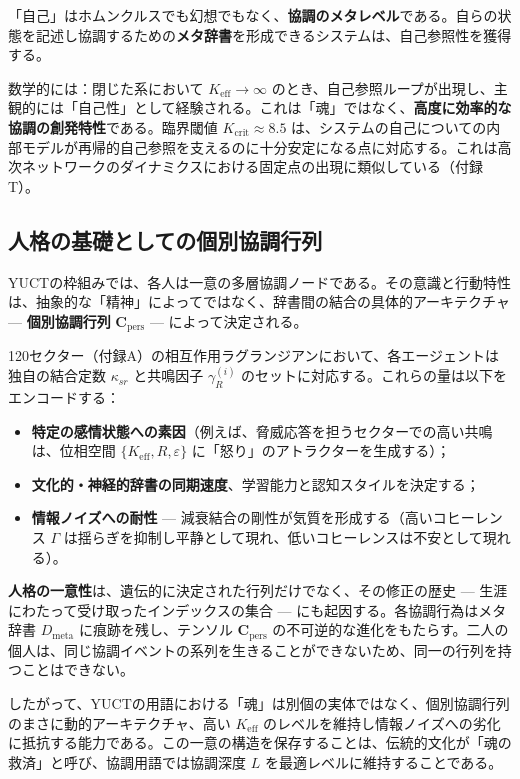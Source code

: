 \documentclass[12pt,a4paper]{article}
\newcommand{\eff}{\mathrm{eff}}
\newcommand{\Ke}{K_{\eff}}
\newcommand{\Kcrit}{K_{\mathrm{crit}}}
\begin{document}
	「自己」はホムンクルスでも幻想でもなく、\textbf{協調のメタレベル}である。自らの状態を記述し協調するための\textbf{メタ辞書}を形成できるシステムは、自己参照性を獲得する。
	
	数学的には：閉じた系において \(\Ke \to \infty\) のとき、自己参照ループが出現し、主観的には「自己性」として経験される。これは「魂」ではなく、\textbf{高度に効率的な協調の創発特性}である。臨界閾値 \(\Kcrit \approx 8.5\) は、システムの自己についての内部モデルが再帰的自己参照を支えるのに十分安定になる点に対応する。これは高次ネットワークのダイナミクスにおける固定点の出現に類似している（付録T）。
	
	\subsection{人格の基礎としての個別協調行列}
	\label{subsec:personality-matrix}
	
	YUCTの枠組みでは、各人は一意の多層協調ノードである。その意識と行動特性は、抽象的な「精神」によってではなく、辞書間の結合の具体的アーキテクチャ — \textbf{個別協調行列} \(\mathbf{C}_{\text{pers}}\) — によって決定される。
	
	120セクター（付録A）の相互作用ラグランジアンにおいて、各エージェントは独自の結合定数 \(\kappa_{sr}\) と共鳴因子 \(\gamma_{R}^{(i)}\) のセットに対応する。これらの量は以下をエンコードする：
	\begin{itemize}
		\item \textbf{特定の感情状態への素因}（例えば、脅威応答を担うセクターでの高い共鳴は、位相空間 \(\{K_{\mathrm{eff}}, R, \varepsilon\}\) に「怒り」のアトラクターを生成する）；
		\item \textbf{文化的・神経的辞書の同期速度}、学習能力と認知スタイルを決定する；
		\item \textbf{情報ノイズへの耐性} — 減衰結合の剛性が気質を形成する（高いコヒーレンス \(\Gamma\) は揺らぎを抑制し平静として現れ、低いコヒーレンスは不安として現れる）。
	\end{itemize}
	
	\textbf{人格の一意性}は、遺伝的に決定された行列だけでなく、その修正の歴史 — 生涯にわたって受け取ったインデックスの集合 — にも起因する。各協調行為はメタ辞書 \(D_{\text{meta}}\) に痕跡を残し、テンソル \(\mathbf{C}_{\text{pers}}\) の不可逆的な進化をもたらす。二人の個人は、同じ協調イベントの系列を生きることができないため、同一の行列を持つことはできない。
	
	したがって、YUCTの用語における「魂」は別個の実体ではなく、個別協調行列のまさに動的アーキテクチャ、高い \(K_{\mathrm{eff}}\) のレベルを維持し情報ノイズへの劣化に抵抗する能力である。この一意の構造を保存することは、伝統的文化が「魂の救済」と呼び、協調用語では協調深度 \(L\) を最適レベルに維持することである。
	
\end{document}
